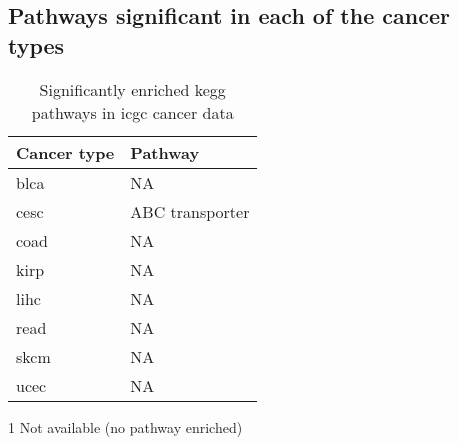 \begin{appendices}
\section{Pathways significant in each of the cancer types}
\label{sec:pathways_significant_in_each_of_the_cancer_types}

\begin{table}[htpb]
	\centering
	\caption{Significantly enriched \gls{kegg} pathways in \gls{icgc} cancer data}
	\label{tab:sig_path_kegg}
	\begin{threeparttable}
		\begin{tabular}{ll}
			Cancer type                      & Pathway         \\
			\hline
			\hline
				\rule{0pt}{2.25ex}\gls{blca} & NA\tnote{1}             \\
				\gls{cesc}                   & ABC transporter \\
				\gls{coad}                   & NA              \\
				\gls{kirp}                   & NA              \\
				\gls{lihc}                   & NA              \\
				\gls{read}                   & NA              \\
				\gls{skcm}                   & NA              \\
				\gls{ucec}                   & NA              \\
			\hline
			\hline
		\end{tabular}
		\begin{tablenotes}
			\item [1] Not available (no pathway enriched)
		\end{tablenotes}
	\end{threeparttable}
\end{table}


\end{appendices}
